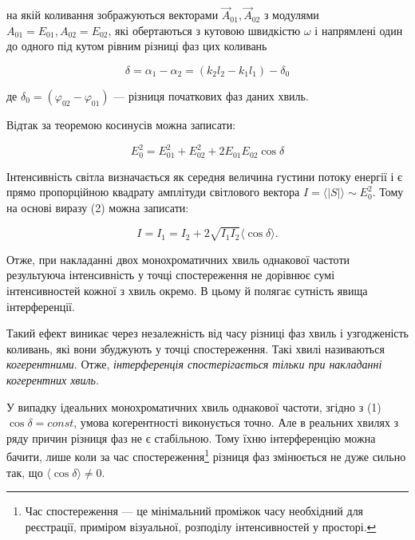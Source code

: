 \documentclass[12pt,a4paper]{article}
\begin{document}
    на якій коливання зображуються векторами $\vec{A}_{01}, \vec{A}_{02}$ з модулями  $A_{01} = E_{01}, A_{02} = E_{02}$, 
    які обертаються з кутовою швидкістю $\omega$ і напрямлені один до одного під
    кутом рівним різниці фаз цих коливань

    \begin{equation}
        \delta = \alpha_1 - \alpha_2 = (k_2 l_2 - k_1 l_1) - \delta_0
        \tag{1}
    \end{equation}

    де $\delta_0 = (\varphi_{02} - \varphi_{01})$ --- різниця початкових фаз даних хвиль.

    Відтак за теоремою косинусів можна записати:

    \begin{equation}
        E_0^2 = E_{01}^2 + E_{02}^2 + 2E_{01} E_{02} \cos \delta
        \tag{2}
    \end{equation}

    Інтенсивність світла визначається як середня величина густини потоку енергії і є прямо пропорційною квадрату амплітуди
    світлового вектора $I = \langle |S| \rangle \sim E_0^2$. Тому на основі виразу (2) можна записати:

    \begin{equation}
        I = I_1 = I_2 + 2\sqrt{I_1 I_2} \langle \cos \delta \rangle.
        \tag{3}
    \end{equation}

    Отже, при накладанні двох монохроматичних хвиль однакової частоти результуюча інтенсивність у точці
    спостереження не дорівнює сумі інтенсивностей кожної з хвиль окремо. В цьому й полягає сутність явища інтерференції.

    Такий ефект виникає через незалежність від часу різниці фаз хвиль і узгодженість коливань, які вони збуджують у точці спостереження.
    Такі хвилі називаються \textit{когерентними}. Отже, \textit{інтерференція спостерігається тільки при накладанні когерентних хвиль}.

    У випадку ідеальних монохроматичних хвиль однакової частоти, згідно з (1) $\cos \delta = const$, умова когерентності виконується точно. Але в реальних
    хвилях з ряду причин різниця фаз не є стабільною. Тому їхню інтерференцію
    можна бачити, лише коли за час спостереження\footnote{Час спостереження --- це мінімальний проміжок часу необхідний для реєстрації, приміром візуальної, розподілу інтенсивностей у просторі.}
    різниця фаз змінюється не дуже сильно так, що $\langle \cos \delta \rangle \neq 0$.
\end{document}
